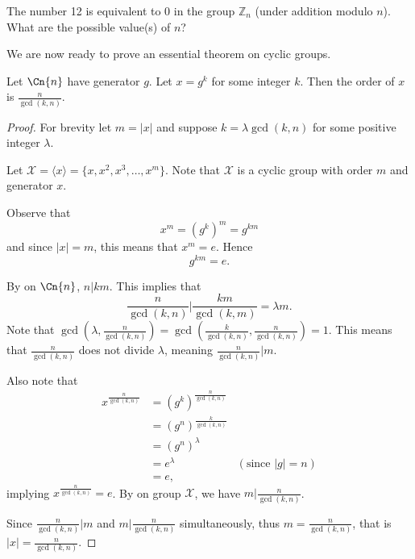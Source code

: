 \begin{exercise}
    The number 12 is equivalent to 0 in the group $\mathbb{Z}_n$ (under addition modulo $n$). What are the possible value(s) of $n$?
\end{exercise}

We are now ready to prove an essential theorem on cyclic groups.
\begin{theorem}\label{thrm-order-of-element-in-cyclic-group}
    Let $\Cn{n}$ have generator $g$. Let $x = g^k$ for some integer $k$. Then the order of $x$ is $\frac{n}{\gcd(k,n)}$.
\end{theorem}
\begin{proof}
    For brevity let $m = |x|$ and suppose $k = \lambda \gcd(k, n)$ for some positive integer $\lambda$.

    Let $\mathcal{X} = \langle x \rangle = \{x, x^2, x^3, \dots, x^m\}$. Note that $\mathcal{X}$ is a cyclic group with order $m$ and generator $x$.

    Observe that
    \[
        x^m = \left(g^k\right)^m = g^{km}
    \]
    and since $|x| = m$, this means that $x^m = e$. Hence
    \[
        g^{km} = e.
    \]

    By  on $\Cn{n}$, $n \vert km$. This implies that
    \[
        \frac{n}{\gcd(k,n)} \vert \frac{km}{\gcd(k,m)} = \lambda m.
    \]
    Note that $\gcd\left(\lambda, \frac{n}{\gcd(k,n)}\right) = \gcd\left(\frac{k}{\gcd(k,n)}, \frac{n}{\gcd(k,n)}\right) = 1$. This means that $\frac{n}{\gcd(k,n)}$ does not divide $\lambda$, meaning $\frac{n}{\gcd(k,n)} \vert m$.

    Also note that
    \begin{align*}
        x^{\frac{n}{\gcd(k,n)}} &= \left(g^k\right)^{\frac{n}{\gcd(k,n)}}\\
        &= \left(g^n\right)^{\frac{k}{\gcd(k,n)}}\\
        &= \left(g^n\right)^\lambda\\
        &= e^\lambda & (\text{since } |g| = n)\\
        &= e,
    \end{align*}
    implying $x^{\frac{n}{\gcd(k,n)}} = e$. By  on group $\mathcal{X}$, we have $m \vert \frac{n}{\gcd(k,n)}$.

    Since $\frac{n}{\gcd(k,n)} \vert m$ and $m \vert \frac{n}{\gcd(k,n)}$ simultaneously, thus $m = \frac{n}{\gcd(k,n)}$, that is $|x| = \frac{n}{\gcd(k,n)}$.
\end{proof}

